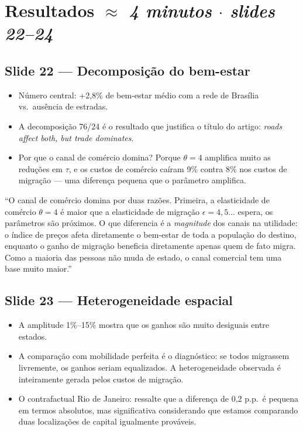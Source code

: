 \documentclass[12pt, a4paper]{article}
\begin{document}
\vspace{0.3cm}

\section{Resultados \hfill \normalfont\small\textit{$\approx$ 4 minutos $\cdot$ slides 22--24}}

\subsection*{Slide 22 --- Decomposição do bem-estar}

\begin{itemize}
    \item Número central: +2,8\% de bem-estar médio com a rede de Brasília vs.\ ausência de estradas.
    \item A decomposição 76/24 é o resultado que justifica o título do artigo: \textit{roads affect both, but trade dominates}.
    \item Por que o canal de comércio domina? Porque $\theta = 4$ amplifica muito as reduções em $\tau$, e os custos de comércio caíram 9\% contra 8\% nos custos de migração --- uma diferença pequena que o parâmetro amplifica.
\end{itemize}

\begin{mdframed}[style=sintese]
``O canal de comércio domina por duas razões. Primeira, a elasticidade de comércio $\theta = 4$
é maior que a elasticidade de migração $\epsilon = 4{,}5$... espera, os parâmetros são próximos.
O que diferencia é a \textit{magnitude} dos canais na utilidade: o índice de preços afeta diretamente
o bem-estar de toda a população do destino, enquanto o ganho de migração beneficia diretamente
apenas quem de fato migra. Como a maioria das pessoas não muda de estado, o canal comercial
tem uma base muito maior.''
\end{mdframed}

\subsection*{Slide 23 --- Heterogeneidade espacial}

\begin{itemize}
    \item A amplitude 1\%--15\% mostra que os ganhos são muito desiguais entre estados.
    \item A comparação com mobilidade perfeita é o diagnóstico: se todos migrassem livremente, os ganhos seriam equalizados. A heterogeneidade observada é inteiramente gerada pelos custos de migração.
    \item O contrafactual Rio de Janeiro: ressalte que a diferença de 0,2 p.p.\ é pequena em termos absolutos, mas significativa considerando que estamos comparando duas localizações de capital igualmente prováveis.
\end{itemize}
\end{document}

